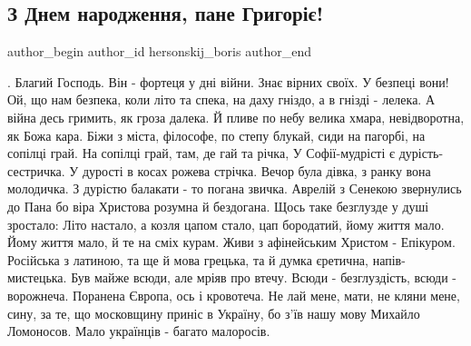  
 
 
 
 
 
\subsection{З Днем народження, пане Григоріє!}
\label{sec:03_12_2021.fb.hersonskij_boris.1.birthday_skovoroda}
 
\ifcmt
 author_begin
   author_id hersonskij_boris
 author_end
\fi


\begin{multicols}{2}
\obeycr{}.
\smallskip
Благий Господь. Він - фортеця у дні війни.
Знає  вірних своїх. У безпеці вони!
Ой, що нам безпека, коли літо та спека,
на даху гніздо, а в гнізді - лелека.
\smallskip
А війна десь гримить, як гроза далека.
Й пливе по небу велика хмара,
невідворотна, як Божа кара.
\smallskip
Біжи з міста, філософе, по степу блукай,
сиди на пагорбі, на сопілці грай.
На сопілці грай, там, де гай та річка,
У Софії-мудрісті є дурість-сестричка.
У дурості  в косах рожева стрічка.
\smallskip
Вечор була дівка, з ранку вона молодичка.
З дурістю балакати - то погана звичка.
Аврелій з Сенекою звернулись до Пана
бо віра Христова розумна й бездогана.
\smallskip
Щось таке безглузде у душі зростало:
Літо настало, а козля цапом стало,
цап бородатий, йому життя мало.
\smallskip
Йому життя мало, й те на сміх курам.
Живи з афінейським Христом - Епікуром.
Російська з латиною, та ще й мова грецька,
та й думка єретична, напів-мистецька.
\smallskip
Був майже всюди, але мріяв про втечу.
Всюди - безглуздість, всюди - ворожнеча.
Поранена Європа, ось і кровотеча.
\smallskip
Не лай мене, мати, не кляни мене, сину,
за те, що московщину приніс в Україну,
бо з'їв нашу мову Михайло Ломоносов.
Мало українців - багато малоросів.
\restorecr
\end{multicols}


